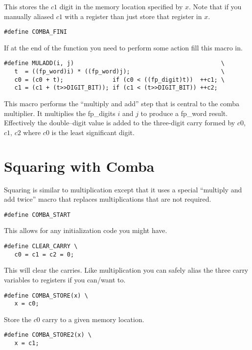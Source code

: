 \documentclass[b5paper]{book}
\begin{document}
This stores the $c1$ digit in the memory location specified by $x$.  Note that if you manually 
aliased $c1$ with a register than just store that register in $x$.  

\begin{verbatim}
#define COMBA_FINI
\end{verbatim}

If at the end of the function you need to perform some action fill this macro in. 

\begin{verbatim}
#define MULADD(i, j)                                          \
   t  = ((fp_word)i) * ((fp_word)j);                          \
   c0 = (c0 + t);              if (c0 < ((fp_digit)t))  ++c1; \
   c1 = (c1 + (t>>DIGIT_BIT)); if (c1 < (t>>DIGIT_BIT)) ++c2;
\end{verbatim}

This macro performs the ``multiply and add'' step that is central to the comba
multiplier.  It multiplies the fp\_digits $i$ and $j$ to produce a fp\_word result.  Effectively
the double--digit value is added to the three-digit carry formed by $c0$, $c1$, $c2$ where $c0$
is the least significant digit.

\section{Squaring with Comba}
Squaring is similar to multiplication except that it uses a special ``multiply and add twice'' macro
that replaces multiplications that are not required.

\begin{verbatim}
#define COMBA_START
\end{verbatim}

This allows for any initialization code you might have.  

\begin{verbatim}
#define CLEAR_CARRY \
   c0 = c1 = c2 = 0;
\end{verbatim}

This will clear the carries.  Like multiplication you can safely alias the three carry variables
to registers if you can/want to.

\begin{verbatim}
#define COMBA_STORE(x) \
   x = c0;
\end{verbatim}

Store the $c0$ carry to a given memory location.

\begin{verbatim}
#define COMBA_STORE2(x) \
   x = c1;
\end{verbatim}
\end{document}
